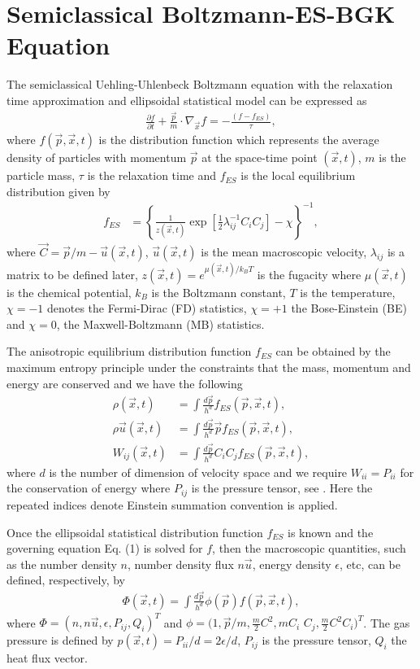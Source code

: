\documentclass[doublecol]{epl2}
\begin{document}
\section{Semiclassical Boltzmann-ES-BGK Equation}

The semiclassical Uehling-Uhlenbeck Boltzmann equation with the relaxation time approximation and ellipsoidal statistical model can be expressed as
\begin{align}
\frac{\partial f}{\partial t} + \frac{\vec p}{m} \cdot \nabla_{\vec x} f  =  -\frac{(f - f_{ES})}{\tau},
\end{align}
where  $f(\vec p, \vec x, t)$ is the distribution function which represents the average density of particles with momentum $\vec p$ at the space-time point $(\vec x, t)$, $m$ is the particle mass, $\tau$ is the relaxation time and $f_{ES}$ is the local equilibrium distribution given by
\begin{align}
f_{ES} &=\left\{ \frac{1}{z(\vec x,t)} \exp[ \frac{1}{2} \lambda_{i j}^{-1} C_{i} C_{j} ] - \chi \right\}^{-1},
\end{align}
where $\vec C=\vec p/m -\vec u(\vec x,t)$, $\vec u(\vec x,t)$ is the mean macroscopic velocity, $\lambda_{i j}$ is a matrix to be defined later, $z(\vec x, t)= e^{ \mu(\vec x, t) /k_B T }$ is the fugacity where $\mu(\vec x,t)$ is the chemical potential, $k_B$ is the Boltzmann constant, $T$ is the temperature, $\chi = -1$ denotes the Fermi-Dirac (FD) statistics, $\chi = +1$ the Bose-Einstein (BE) and $\chi = 0$, the Maxwell-Boltzmann (MB) statistics.

The anisotropic equilibrium distribution function $f_{ES}$ can be obtained by the maximum entropy principle under the constraints that the mass, momentum and energy are conserved and we have the following
\begin{align}
\rho(\vec x, t) &= \int \frac{d \vec p}{h^d}   f_{ES}(\vec p, \vec x, t), \\
\rho \vec u(\vec x, t) &= \int \frac{d \vec p}{h^d} \vec p  f_{ES}(\vec p, \vec x, t), \\
W_{i j}(\vec x, t) &= \int \frac{d \vec p}{h^d} C_{i} C_{j} f_{ES}(\vec p, \vec x, t),
\end{align}
where $d$ is the number of dimension of velocity space and we require $W_{i i}=P_{i i}$ for the conservation of energy where $P_{ij}$ is the pressure tensor, see \cite{Wu2012}.  Here the repeated indices denote Einstein summation convention is applied.

Once the ellipsoidal statistical distribution function $f_{ES}$ is known and the governing equation Eq. (1) is solved for $f$, then the macroscopic quantities, such as the number density $n$, number density flux $n\vec u$, energy density $\epsilon$, etc, can be defined, respectively, by
\begin{align}
\Phi (\vec x, t) = \int \frac{d \vec p }{ h^d} \phi(\vec p) f(\vec p, \vec x, t),
\end{align}
where $\Phi = (n, n\vec u, \epsilon, P_{ij}, Q_{i})^T$ and $\phi = (1, \vec p/m, \frac{m}{2} C^2, m C_{i} $ $C_{j}, \frac{m}{2}C^2 C_{i} )^T$.  The gas pressure is defined by $p(\vec x, t) = P_{i i}/d = 2 \epsilon /d$, $P_{ij}$ is the pressure tensor, $Q_{i}$ the heat flux vector.
\end{document}
